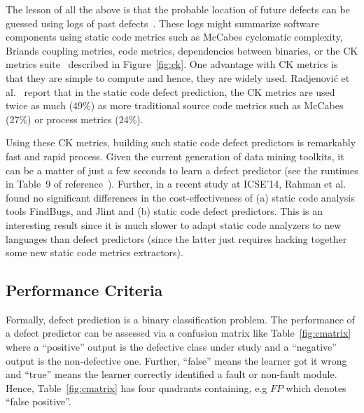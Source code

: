 \documentclass[10pt,conference]{IEEEtran}
\theoremstyle{break}
\theoremstyle{break}
\begin{document}
The lesson of all the above  is that the probable location
of future defects can be guessed using   logs of past defects~\cite{hall2012systematic, catal2009systematic}. These logs might
summarize software components using
static code metrics such as 
McCabes  cyclomatic  complexity, Briands coupling metrics, code metrics,  
dependencies between  binaries, or
the  CK  metrics  suite~\cite{chidamber1994metrics} described in  Figure~\ref{fig:ck}. 
One advantage with CK metrics is that they are  simple  to  compute and hence,
they are widely used. Radjenovi{\'c} et al.~\cite{radjenovic2013software} report that in
the static code defect prediction, the CK metrics are
used  twice as much (49\%) 
as more traditional source code metrics such as McCabes (27\%) or process metrics (24\%).

Using these CK metrics, building such static code defect predictors is remarkably fast and rapid process.
Given the current generation of data mining toolkits, it can be a matter
of just a few seconds to learn a defect predictor (see the runtimes in Table~9 of reference~\cite{fu2016tuning}). Further, in a recent study at ICSE'14, Rahman et
al.~\cite{Rahman14} found no significant differences in the cost-effectiveness
of
(a) static code analysis tools FindBugs, and Jlint and (b) static code defect predictors.
This is an interesting result since it is  much slower to adapt static code
analyzers to new  languages than defect predictors (since the latter just requires hacking together some new
static code metrics extractors).

\subsection{Performance Criteria}
\label{sect:performance}



Formally, defect prediction is a binary classification problem.
The performance of a defect predictor can be assessed via a  confusion matrix like Table~\ref{fig:cmatrix}
where a ``positive'' output is the defective class under study and a ``negative'' output is the non-defective one.
Further, ``false'' means the learner got it wrong and ``true'' means the learner correctly identified
a fault or non-fault module. Hence, Table~\ref{fig:cmatrix} has four quadrants containing, e.g $\mathit{FP}$ which denotes ``false positive''.
\end{document}
